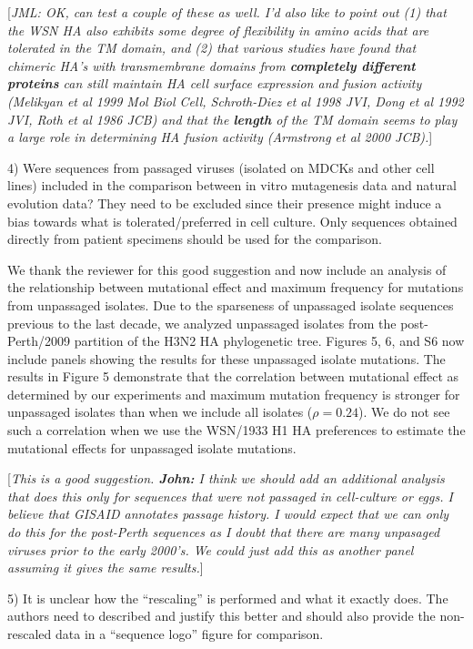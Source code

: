 \documentclass[11pt, oneside]{article}   	%
\newcommand{\comment}[1]{{\color{red}[\textsl{#1}]}}
\newcommand{\response}[1]{{\color{black}#1}}
\begin{document}
\comment{JML: OK, can test a couple of these as well. I'd also like to point out (1) that the WSN HA also exhibits some degree of flexibility in amino acids that are tolerated in the TM domain, and (2) that various studies have found that chimeric HA's with transmembrane domains from {\bf completely different proteins} can still maintain HA cell surface expression and fusion activity (Melikyan et al 1999 Mol Biol Cell, Schroth-Diez et al 1998 JVI, Dong et al 1992 JVI, Roth et al 1986 JCB) and that the {\bf length} of the TM domain seems to play a large role in determining HA fusion activity (Armstrong et al 2000 JCB).} 

4) Were sequences from passaged viruses (isolated on MDCKs and other cell lines) included in the comparison between in vitro mutagenesis data and natural evolution data? They need to be excluded since their presence might induce a bias towards what is tolerated/preferred in cell culture. Only sequences obtained directly from patient specimens should be used for the comparison. 

\response{We thank the reviewer for this good suggestion and now include an analysis of the relationship between mutational effect and maximum frequency for mutations from unpassaged isolates.
Due to the sparseness of unpassaged isolate sequences previous to the last decade, we analyzed unpassaged isolates from the post-Perth/2009 partition of the H3N2 HA phylogenetic tree.
Figures 5, 6, and S6 now include panels showing the results for these unpassaged isolate mutations.
The results in Figure 5 demonstrate that the correlation between mutational effect as determined by our experiments and maximum mutation frequency is stronger for unpassaged isolates than when we include all isolates ($\rho = 0.24$).
We do not see such a correlation when we use the WSN/1933 H1 HA preferences to estimate the mutational effects for unpassaged isolate mutations.
}

\comment{This is a good suggestion. 
{\bf John:} I think we should add an additional analysis that does this only for sequences that were not passaged in cell-culture or eggs.
I believe that GISAID annotates passage history.
I would expect that we can only do this for the post-Perth sequences as I doubt that there are many unpasaged viruses prior to the early 2000's.
We could just add this as another panel assuming it gives the same results.}

5) It is unclear how the ``rescaling'' is performed and what it exactly does. The authors need to described and justify this better and should also provide the non-rescaled data in a ``sequence logo'' figure for comparison. 
\end{document}
